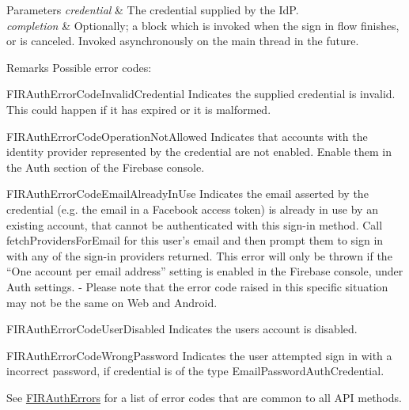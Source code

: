 \begin{DoxyParams}{Parameters}
{\em credential} & The credential supplied by the Id\+P. \\
\hline
{\em completion} & Optionally; a block which is invoked when the sign in flow finishes, or is canceled. Invoked asynchronously on the main thread in the future. \\
\hline
\end{DoxyParams}
\begin{DoxyRemark}{Remarks}
Possible error codes\+:
\begin{DoxyItemize}
\item {\ttfamily F\+I\+R\+Auth\+Error\+Code\+Invalid\+Credential} Indicates the supplied credential is invalid. This could happen if it has expired or it is malformed.
\item {\ttfamily F\+I\+R\+Auth\+Error\+Code\+Operation\+Not\+Allowed} Indicates that accounts with the identity provider represented by the credential are not enabled. Enable them in the Auth section of the Firebase console.
\item {\ttfamily F\+I\+R\+Auth\+Error\+Code\+Email\+Already\+In\+Use} Indicates the email asserted by the credential (e.\+g. the email in a Facebook access token) is already in use by an existing account, that cannot be authenticated with this sign-\/in method. Call fetch\+Providers\+For\+Email for this user’s email and then prompt them to sign in with any of the sign-\/in providers returned. This error will only be thrown if the “\+One account per email address” setting is enabled in the Firebase console, under Auth settings. -\/ Please note that the error code raised in this specific situation may not be the same on Web and Android.
\item {\ttfamily F\+I\+R\+Auth\+Error\+Code\+User\+Disabled} Indicates the user\textquotesingle{}s account is disabled.
\item {\ttfamily F\+I\+R\+Auth\+Error\+Code\+Wrong\+Password} Indicates the user attempted sign in with a incorrect password, if credential is of the type Email\+Password\+Auth\+Credential.
\item See {\ttfamily \hyperlink{interface_f_i_r_auth_errors}{F\+I\+R\+Auth\+Errors}} for a list of error codes that are common to all A\+P\+I methods. 
\end{DoxyItemize}
\end{DoxyRemark}
\hypertarget{interface_f_i_r_auth_ad3ac6db56df7193d2b40648cd9ffd060}{}
